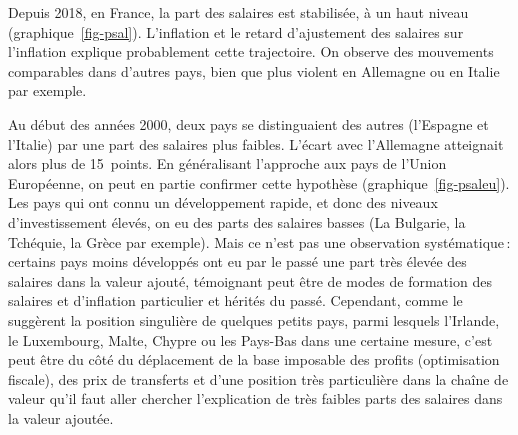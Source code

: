 \documentclass[
  french,
  9pt,
  a4paper,
]{article}
\begin{document}
Depuis 2018, en France, la part des salaires est stabilisée, à un haut
niveau (graphique~\ref{fig-psal}). L'inflation et le retard d'ajustement
des salaires sur l'inflation explique probablement cette trajectoire. On
observe des mouvements comparables dans d'autres pays, bien que plus
violent en Allemagne ou en Italie par exemple.

Au début des années 2000, deux pays se distinguaient des autres
(l'Espagne et l'Italie) par une part des salaires plus faibles. L'écart
avec l'Allemagne atteignait alors plus de 15~points. En généralisant
l'approche aux pays de l'Union Européenne, on peut en partie confirmer
cette hypothèse (graphique~\ref{fig-psaleu}). Les pays qui ont connu un
développement rapide, et donc des niveaux d'investissement élevés, on eu
des parts des salaires basses (La Bulgarie, la Tchéquie, la Grèce par
exemple). Mais ce n'est pas une observation systématique\,: certains
pays moins développés ont eu par le passé une part très élevée des
salaires dans la valeur ajouté, témoignant peut être de modes de
formation des salaires et d'inflation particulier et hérités du passé.
Cependant, comme le suggèrent la position singulière de quelques petits
pays, parmi lesquels l'Irlande, le Luxembourg, Malte, Chypre ou les
Pays-Bas dans une certaine mesure, c'est peut être du côté du
déplacement de la base imposable des profits (optimisation fiscale), des
prix de transferts et d'une position très particulière dans la chaîne de
valeur qu'il faut aller chercher l'explication de très faibles parts des
salaires dans la valeur ajoutée.
\end{document}
